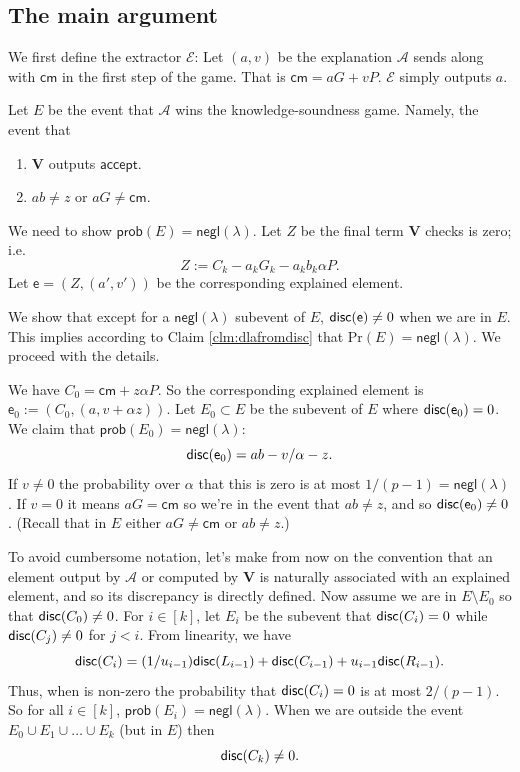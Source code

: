 \documentclass[11pt]{article} %
\newcommand{\adv}{\ensuremath{\mathcal A}\xspace}
\newcommand{\cm}{\ensuremath{\mathsf{cm}}\xspace}
\newcommand{\negl}{\ensuremath{\mathsf{negl}(\lambda)}\xspace}
\newcommand{\acc}{\ensuremath{\mathsf{accept}}\xspace}
\newcommand{\defeq}{:=}
\newcommand{\pr}{\mathrm{Pr}}
\newcommand{\ver}{\ensuremath{\mathsf{\mathbf{V}}}\xspace}
\newcommand{\ext}{\ensuremath{\mathcal{E}}\xspace}
\newcommand{\expln}{\ensuremath{\mathsf{e}}\xspace}
\newcommand{\prob}{\ensuremath{\mathsf{prob}}\xspace}
\begin{document}
\subsection{The main argument}
We first define the extractor \ext:
Let $(a,v)$ be the explanation \adv sends along with \cm in the first step of the game.
That is $\cm = aG+vP$.
\ext simply outputs $a$.


Let $E$ be the event that \adv wins the knowledge-soundness game.
Namely, the event that
\begin{enumerate}
   \item \ver outputs \acc.
   \item $ab\neq z$ or $aG\neq \cm$.
\end{enumerate}
We need to show $\prob(E)=\negl$.
 Let $Z$ be the final term \ver checks is zero; i.e.
 \[Z\defeq C_k - a_k G_k - a_k b_k \alpha P.\]
 Let $\expln=(Z,(a',v'))$ be the corresponding explained element.
 
We show that except for a \negl subevent of $E$, $\disc{\expln}\neq 0$ when we are in $E$.
This implies according to Claim \ref{clm:dlafromdisc} that $\pr(E)=\negl$.  We proceed with the details.

We have $C_0 =\cm+z\alpha P$.
So the corresponding explained element is  $\expln_0\defeq (C_0,(a,v+\alpha z))$.
Let $E_0\subset E$ be the subevent of $E$ where $\disc{\expln_0}=0$. We claim that $\prob(E_0)=\negl$:
 \[\disc{\expln_0} = ab  - v/\alpha - z.\]
If $v\neq 0$ the probability over $\alpha$ that this is zero is at most $1/(p-1)=\negl$.
If $v=0$ it means $aG=\cm$ so we're in the event that $ab\neq z$, and so $\disc{\expln_0}\neq 0$.
(Recall that in $E$ either $aG\neq \cm$ or $ab\neq z$.)


To avoid cumbersome notation, let's make from now on the convention that an element output by \adv or computed by \ver is naturally associated 
with an explained element, and so its discrepancy is directly defined.
Now assume we are in $E\setminus E_0$ so that $\mathsf{disc}(C_0)\neq 0$.
For $i\in [k]$, let $E_i$ be the subevent that $\mathsf{disc}(C_i)= 0$ while $\mathsf{disc}(C_j)\neq 0$ for $j<i$.
From linearity, we have
\[\mathsf{disc}(C_i)= (1/u_{i-1})\mathsf{disc}(L_{i-1})+ \mathsf{disc}(C_{i-1}) + u_{i-1}\mathsf{disc}(R_{i-1}).\]
Thus, when  is non-zero the probability that $\mathsf{disc}(C_i)=0$ is at most $2/(p-1)$.
So for all $i\in [k]$, $\prob(E_i)=\negl$.
When we are outside the event $E_0\cup E_1\cup\ldots\cup E_k$  (but in $E$) then 
\[\mathsf{disc}(C_k)\neq 0.\]
\end{document}
